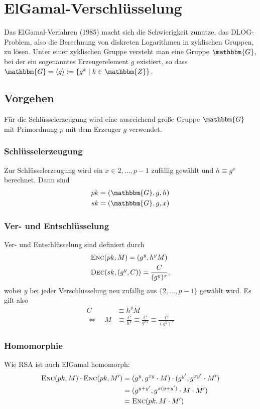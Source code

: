 \section{ElGamal-Verschlüsselung}
\label{ch:asymenc:elgamal} Das ElGamal-Verfahren \indexElGamal (1985)
macht sich die Schwierigkeit zunutze, das DLOG-Problem\indexDLOGProblem,
also die Berechnung von diskreten Logarithmen in zyklischen Gruppen, zu
lösen. Unter einer zyklischen Gruppe versteht man eine Gruppe
$\mathbbm{G}$, bei der ein sogenanntes Erzeugerelement $g$ existiert, so
dass $\mathbbm{G} = \langle g \rangle := \{g^k \mid k \in
\mathbbm{Z}\}$.

\subsection{Vorgehen} Für die Schlüsselerzeugung wird eine ausreichend
große Gruppe $\mathbbm{G}$ mit Primordnung $p$ mit dem Erzeuger $g$
verwendet.
\subsubsection{Schlüsselerzeugung} Zur Schlüsselerzeugung wird ein $x
\in {2,\dots, p-1}$ zufällig gewählt und $h \equiv g^x$ berechnet. Dann
sind
\begin{align*} 
  pk &= (\mathbbm{G}, g, h)\\ sk &= (\mathbbm{G}, g, x)
\end{align*}

\subsubsection{Ver- und Entschlüsselung} Ver- und Entschlüsselung sind
definiert durch
\begin{align*} 
&\textsc{Enc}(pk, M) = (g^y, h^y M) \\ 
&\textsc{Dec}(sk, (g^y, C)) = \frac{C}{(g^y)^x},
\end{align*} 
wobei $y$ bei jeder Verschlüsselung neu zufällig aus $\{2, \dots, p-1\}$
gewählt wird. Es gilt also 
\begin{align*} 
C &\equiv h^y M \\ 
\Leftrightarrow \quad M& \equiv \frac{C}{h^y} \equiv \frac{C}{g^{xy}}
                         \equiv \frac{C}{(g^y)^x} 
\end{align*}

\subsubsection{Homomorphie}\indexElGamalHomomorphie Wie RSA ist auch
ElGamal homomorph:
\begin{align*} 
\textsc{Enc}({pk,M}) \cdot \textsc{Enc}({pk,M'}) &= (g^y, g^{xy} \cdot M)\cdot (g^{y'},
                                   g^{xy'} \cdot M')\\ 
                                 &= (g^{y+y'}, g^{x(y + y')}\cdot M  \cdot M')\\ 
                                 &= \textsc{Enc}({pk, M \cdot M'})
\end{align*}

